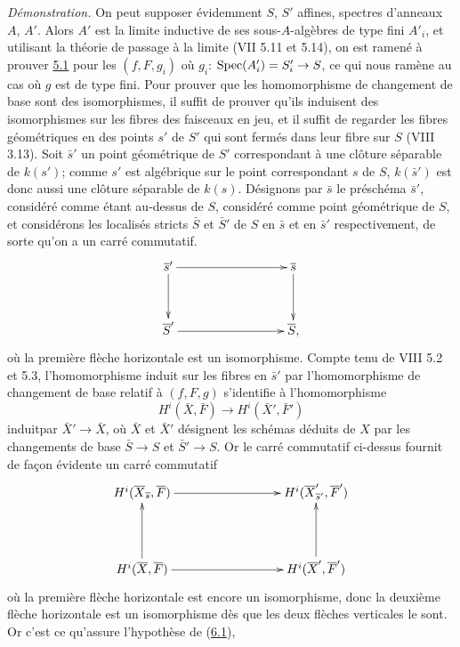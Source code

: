 \documentclass[10pt]{../fichiers-configuration-latex/smfart}
\begin{document}
\noindent
\emph{Démonstration.} On peut supposer évidemment $S$, $S'$ affines,
spectres d'anneaux $A$, $A'$. Alors $A'$ est la limite inductive de
ses sous-$A$-algèbres de type fini $A'_i$, et utilisant la théorie de
passage à la limite (VII 5.11 et 5.14), on est ramené à prouver \hyperref[XII.thm5.1]{5.1}
pour les $(f,F,g_i)$ où $g_i$: $\operatorname{Spec}(A'_i)=S'_i\rightarrow S$, ce qui
nous ramène au cas où $g$ est de type fini. Pour prouver que les
homomorphisme de changement de base sont des isomorphismes, il suffit
de prouver qu'ils induisent des isomorphismes sur les fibres des
faisceaux en jeu, et il suffit de regarder les fibres géométriques en
des points $s'$ de $S'$ qui sont fermés dans leur fibre sur $S$ (VIII
3.13). Soit $\bar{s}'$ un point géométrique de $S'$ correspondant à
une clôture séparable de $k(s')$; comme $s'$ est algébrique sur le
point correspondant $s$ de $S$, $k(\bar{s}')$ est donc aussi une
clôture séparable de $k(s)$. Désignons par $\bar{s}$ le préschéma
$\bar{s}'$, considéré comme étant au-dessus de $S$, \ie considéré
comme point géométrique de $S$, et considérons les localisés stricts
$\bar{S}$ et $\bar{S}'$ de $S$ en $\bar{s}$ et en $\bar{s}'$
respectivement, de sorte qu'on a un carré commutatif.
$$
\vcenter{
\xymatrix@C=3cm@R=1.25cm{
\bar{s}'  \ar[r] \ar[d]& \bar{s}\ar[d]\\
\bar{S}'  \ar[r] &  \bar{S},
}}
$$
où la première flèche horizontale est un isomorphisme. Compte tenu de
VIII 5.2 et 5.3, l'homomorphisme induit sur les fibres en $\bar{s}'$
par l'homomorphisme de changement de base relatif à $(f,F,g)$
s'identifie à l'homomorphisme 
$$
H^{i}(\bar{X},\bar{F})\longrightarrow H^{i}(\bar{X}',\bar{F}')
$$
induit\pageoriginale par $\bar{X}'\rightarrow \bar{X}$, où $\bar{X}$ 
et $\bar{X}'$
désignent les schémas déduits de $X$ par les changements de base
$\bar{S}\rightarrow S$ et $\bar{S}'\rightarrow S$. Or le carré
commutatif ci-dessus fournit de façon évidente un carré commutatif
$$
\xymatrix@C=3cm@R=1.5cm{
H^{i}(\bar{X}_{\bar{s}}, \bar{F}) \ar[r]& H^{i}(\bar{X}'_{\bar{s}'},\bar{F}')
\\
H^{i}(\bar{X},\bar{F})  \ar[r] \ar[u]& H^{i}(\bar{X}',\bar{F}')
\ar[u],
}
$$
où la première flèche horizontale est encore un isomorphisme, donc la
deuxième flèche horizontale est un isomorphisme dès que les deux
flèches verticales le sont. Or c'est ce qu'assure l'hypothèse de
(\hyperref[XII.lem6.1]{6.1}), \cqfd

\setcounter{subsection}{1}
\end{document}
